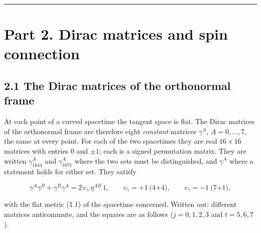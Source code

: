 \documentclass[
  10pt,
]{article}
\begin{document}
\begin{center}\rule{0.5\linewidth}{0.5pt}\end{center}

\hypertarget{part-2.-dirac-matrices-and-spin-connection}{%
\section{Part 2. Dirac matrices and spin
connection}\label{part-2.-dirac-matrices-and-spin-connection}}

\hypertarget{the-dirac-matrices-of-the-orthonormal-frame}{%
\subsection{2.1 The Dirac matrices of the orthonormal
frame}\label{the-dirac-matrices-of-the-orthonormal-frame}}

At each point of a curved spacetime the tangent space is flat. The Dirac
matrices of the orthonormal frame are therefore eight \emph{constant}
matrices \(\gamma^A\), \(A=0,\dots,7\), the same at every point. For
each of the two spacetimes they are real \(16\times16\) matrices with
entries \(0\) and \(\pm1\); each is a signed permutation matrix. They
are written \(\gamma_{1644}^A\) and \(\gamma_{1671}^A\) where the two
sets must be distinguished, and \(\gamma^A\) where a statement holds for
either set. They satisfy

\[\gamma^A\gamma^B+\gamma^B\gamma^A=2\,c_\gamma\,\eta^{AB}\,1,\qquad
c_\gamma=+1\ \text{(4+4)},\qquad c_\gamma=-1\ \text{(7+1)},\tag{2.1}\]

with the flat metric (1.1) of the spacetime concerned. Written out:
different matrices anticommute, and the squares are as follows
(\(j=0,1,2,3\) and \(t=5,6,7\)).
\end{document}
